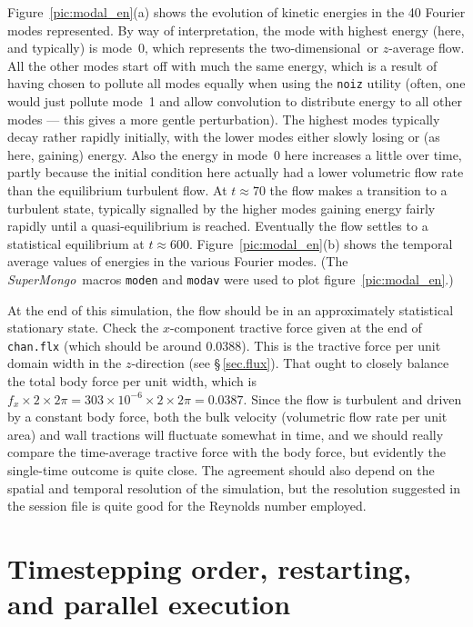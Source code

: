 \documentclass[11pt]{report}
\newcommand{\SM}{\emph{SuperMongo}}
\newcommand\twod{two-di\-men\-sion\-al}
\begin{document}
Figure~\ref{pic:modal_en}(a) shows the evolution of kinetic energies
in the 40 Fourier modes represented.  By way of interpretation, the
mode with highest energy (here, and typically) is mode~0, which
represents the \twod\ or $z$-average flow.  All the other modes start
off with much the same energy, which is a result of having chosen to
pollute all modes equally when using the \verb|noiz| utility (often,
one would just pollute mode~1 and allow convolution to distribute
energy to all other modes --- this gives a more gentle perturbation).
The highest modes typically decay rather rapidly initially, with the
lower modes either slowly losing or (as here, gaining) energy.  Also
the energy in mode~0 here increases a little over time, partly because
the initial condition here actually had a lower volumetric flow rate
than the equilibrium turbulent flow. At $t\approx70$ the flow makes a
transition to a turbulent state, typically signalled by the higher
modes gaining energy fairly rapidly until a quasi-equilibrium is
reached. Eventually the flow settles to a statistical equilibrium at
$t\approx600$.  Figure~\ref{pic:modal_en}(b) shows the temporal
average values of energies in the various Fourier modes.  (The
\SM\ macros \verb|moden| and \verb|modav| were used to plot
figure~\ref{pic:modal_en}.)

At the end of this simulation, the flow should be in an approximately
statistical stationary state.  Check the $x$-component tractive force
given at the end of \verb|chan.flx| (which should be around 0.0388).
This is the tractive force per unit domain width in the $z$-direction
(see \S\,\ref{sec.flux}).  That ought to closely balance the total
body force per unit width, which is
$f_x\times2\times2\pi=303\times10^{-6}\times2\times2\pi=0.0387$.  Since
the flow is turbulent and driven by a constant body force, both the
bulk velocity (volumetric flow rate per unit area) and wall tractions
will fluctuate somewhat in time, and we should really compare the
time-average tractive force with the body force, but evidently the
single-time outcome is quite close.  The agreement should also depend
on the spatial and temporal resolution of the simulation, but the
resolution suggested in the session file is quite good for the
Reynolds number employed.

\section{Timestepping order, restarting, and parallel execution}
\label{sec.restart}
\end{document}
